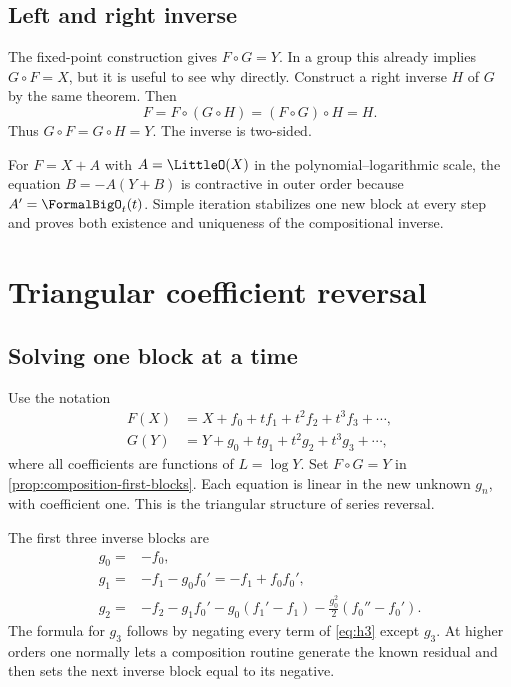 \documentclass[11pt,oneside]{book}
\theoremstyle{definition}
\theoremstyle{remark}
\newcommand{\compose}{\mathbin{\circ}}
\begin{document}
\section{Left and right inverse}
The fixed-point construction gives $F\compose G=Y$.  In a group this already
implies $G\compose F=X$, but it is useful to see why directly.  Construct a
right inverse $H$ of $G$ by the same theorem.  Then
\[
 F=F\compose(G\compose H)=(F\compose G)\compose H=H.
\]
Thus $G\compose F=G\compose H=Y$.  The inverse is two-sided.

\begin{summarybox}
For $F=X+A$ with $A=\LittleO(X)$ in the polynomial--logarithmic scale, the equation
$B=-A(Y+B)$ is contractive in outer order because $A'=\FormalBigO_t(t)$.  Simple
iteration stabilizes one new block at every step and proves both existence and
uniqueness of the compositional inverse.
\end{summarybox}


\chapter{Triangular coefficient reversal}
\label{ch:reversion-triangular}

\section{Solving one block at a time}
Use the notation
\begin{align*}
 F(X)&=X+f_0+t f_1+t^2f_2+t^3f_3+\cdots,\\
 G(Y)&=Y+g_0+t g_1+t^2g_2+t^3g_3+\cdots,
\end{align*}
where all coefficients are functions of $L=\log Y$.  Set $F\compose G=Y$ in
\cref{prop:composition-first-blocks}.  Each equation is linear in the new
unknown $g_n$, with coefficient one.  This is the triangular structure of
series reversal.

The first three inverse blocks are
\begin{align}
 g_0={}&-f_0,\label{eq:inverse-g0}\\
 g_1={}&-f_1-g_0f_0'= -f_1+f_0f_0',\label{eq:inverse-g1}\\
 g_2={}&-f_2-g_1f_0'-g_0(f_1'-f_1)
 -\frac{g_0^2}{2}(f_0''-f_0').
 \label{eq:inverse-g2}
\end{align}
The formula for $g_3$ follows by negating every term of \eqref{eq:h3} except
$g_3$.  At higher orders one normally lets a composition routine generate the
known residual and then sets the next inverse block equal to its negative.
\end{document}
